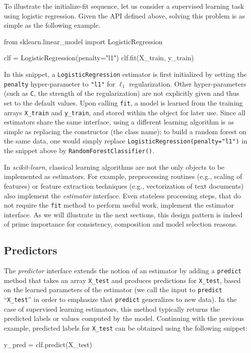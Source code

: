 \documentclass{llncs}
\newcommand{\sklearn}{\textit{scikit-learn}\xspace}
\begin{document}
To illustrate the initialize-fit sequence,
let us consider a supervised learning task using logistic regression.
Given the API defined above, solving this problem is as simple as the following
example.
\begin{pythoncode}
from sklearn.linear_model import LogisticRegression

clf = LogisticRegression(penalty="l1")
clf.fit(X_train, y_train)
\end{pythoncode}
In this snippet, a \texttt{LogisticRegression} estimator is first initialized by
setting the \texttt{penalty} hyper-parameter to \texttt{"l1"} for
$\ell_1$ regularization. Other hyper-parameters (such as \texttt{C},
the strength of the regularization) are not explicitly given and
thus set to the default values. Upon calling \texttt{fit}, a model is
learned from the training arrays \texttt{X\_train} and \texttt{y\_train},
and stored within the object for later use.
Since all estimators share the same interface, using a different learning algorithm is
as simple as replacing the constructor (the class name);
to build a random forest on
the same data, one would simply replace
\texttt{LogisticRegression(penalty="l1")} in the snippet above by
\texttt{RandomForestClassifier()}.

In \sklearn, classical learning algorithms are not the only objects to be
implemented as estimators. For example, preprocessing routines (e.g., scaling of
features) or feature extraction techniques (e.g., vectorization of text
documents) also implement the \textit{estimator} interface. Even stateless
processing steps, that do not require the \texttt{fit} method to
perform useful work, implement the estimator interface. As we will illustrate
in the next sections, this design pattern is indeed of prime importance for
consistency, composition and model selection reasons.

\subsection{Predictors}

The \textit{predictor} interface extends the notion of an estimator
by adding a \texttt{predict}
method that takes an array \texttt{X\_test} and produces
predictions for \texttt{X\_test}, based on the learned parameters of the
estimator (we call the input to \texttt{predict} ``\texttt{X\_test}'' in order
to emphasize that \texttt{predict} generalizes to new data). In the case of
supervised learning estimators, this method typically returns the predicted
labels or values computed by the model.  Continuing with the previous example,
predicted labels for \texttt{X\_test} can be obtained using the following
snippet:
\begin{pythoncode}
y_pred = clf.predict(X_test)
\end{pythoncode}
\end{document}
